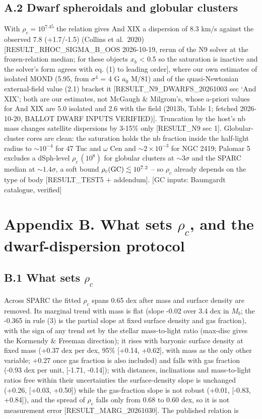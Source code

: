 \documentclass[
  10pt,
]{article}
\begin{document}
\subsection{A.2 Dwarf spheroidals and globular clusters}\label{dwarf-spheroidals-and-globular-clusters}

With $\rho_c=10^{7.45}$ the relation gives And XIX a dispersion of 8.3 km/s
against the observed 7.8 (+1.7/-1.5) (Collins et al.~2020)
{[}RESULT\_RHOC\_SIGMA\_B\_OOS 2026-10-19, rerun of the N9 solver at the
frozen-relation median; for these objects $x_b$ \textless{} 0.5 so the
saturation is inactive and the solver's form agrees with eq. (1) to
leading order{]}, where our own estimates of isolated MOND (5.95, from
$\sigma^4$ = 4 G $a_0$ M/81) and of the quasi-Newtonian external-field
value (2.1) bracket it {[}RESULT\_N9\_DWARFS\_20261003 sec `And XIX';
both are our estimates, not McGaugh \& Milgrom's, whose a-priori values
for And XIX are 5.0 isolated and 2.6 with the field (2013b,
Table 1; fetched 2026-10-20, BALLOT DWARF INPUTS VERIFIED){]}.
Truncation by the host's nb mass changes satellite dispersions by 3-15\%
only {[}RESULT\_N9 sec 1{]}. Globular-cluster cores are clean: the
saturation holds the nb fraction inside the half-light radius to
$\sim10^{-4}$ for 47 Tuc and $\omega$ Cen and $\sim2\times10^{-3}$ for
NGC 2419; Palomar 5 excludes a dSph-level $\rho_c\,(10^{8})$ for globular clusters
at $\sim3\sigma$ and the SPARC median at $\sim1.4\sigma$, a soft bound $\rho_c({\rm GC})\lesssim 10^{7.2}$ --
so $\rho_c$ already depends on the type of body {[}RESULT\_TEST5 +
addendum{]}. {[}GC inputs: Baumgardt catalogue, verified{]}

\section{Appendix B. What sets \texorpdfstring{$\rho_c$}{rho c}, and the dwarf-dispersion protocol}\label{appendix-b.-what-sets-rho_c-and-the-dwarf-dispersion-protocol}

\subsection{B.1 What sets \texorpdfstring{$\rho_c$}{rho c}}\label{what-sets-rho_c}

Across SPARC the fitted $\rho_c$ spans 0.65 dex after mass and surface
density are removed. Its marginal trend with mass is flat (slope -0.02
over 3.4 dex in $M_b$; the -0.365 in rule (3) is the partial slope at
fixed surface density and gas fraction), with the sign of any trend set
by the stellar mass-to-light ratio (max-disc gives the Kormendy \&
Freeman direction); it rises with baryonic surface density at fixed mass
(+0.37 dex per dex, 95\% {[}+0.14, +0.62{]}, with mass as the only other
variable; +0.27 once gas fraction is also included) and falls with gas fraction (-0.93 dex per unit, {[}-1.71, -0.14{]}); with distances, inclinations and mass-to-light ratios free within their uncertainties the surface-density slope is unchanged (+0.26, {[}+0.03, +0.50{]}) while the gas-fraction slope is not robust (+0.01, {[}-0.83, +0.84{]}), and the spread of $\rho_c$ falls only from 0.68 to 0.60 dex, so it is not measurement error {[}RESULT\_MARG\_20261030{]}. The published
relation is
\end{document}
